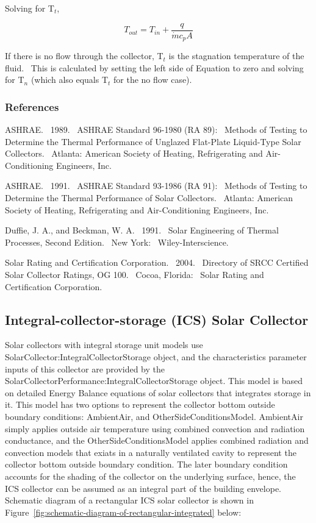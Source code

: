 Solving for T\(_{t}\),

\begin{equation}
{T_{out}} = {T_{in}} + \frac{q}{{\dot m{c_p}A}}
\end{equation}

If there is no flow through the collector, T\(_{t}\) is the stagnation temperature of the fluid.~ This is calculated by setting the left side of Equation to zero and solving for T\(_{n}\) (which also equals T\(_{t}\) for the no flow case).

\subsubsection{References}\label{references-042}

ASHRAE.~ 1989.~ ASHRAE Standard 96-1980 (RA 89):~ Methods of Testing to Determine the Thermal Performance of Unglazed Flat-Plate Liquid-Type Solar Collectors.~ Atlanta: American Society of Heating, Refrigerating and Air-Conditioning Engineers, Inc.

ASHRAE.~ 1991.~ ASHRAE Standard 93-1986 (RA 91):~ Methods of Testing to Determine the Thermal Performance of Solar Collectors.~ Atlanta: American Society of Heating, Refrigerating and Air-Conditioning Engineers, Inc.

Duffie, J. A., and Beckman, W. A.~ 1991.~ Solar Engineering of Thermal Processes, Second Edition.~ New York:~ Wiley-Interscience.

Solar Rating and Certification Corporation.~ 2004.~ Directory of SRCC Certified Solar Collector Ratings, OG 100.~ Cocoa, Florida:~ Solar Rating and Certification Corporation.

\subsection{Integral-collector-storage (ICS) Solar Collector}\label{integral-collector-storage-ics-solar-collector}

Solar collectors with integral storage unit models use SolarCollector:IntegralCollectorStorage object, and the characteristics parameter inputs of this collector are provided by the SolarCollectorPerformance:IntegralCollectorStorage object. This model is based on detailed Energy Balance equations of solar collectors that integrates storage in it. This model has two options to represent the collector bottom outside boundary conditions: AmbientAir, and OtherSideConditionsModel. AmbientAir simply applies outside air temperature using combined convection and radiation conductance, and the OtherSideConditionsModel applies combined radiation and convection models that exiats in a naturally ventilated cavity to represent the collector bottom outside boundary condition. The later boundary condition accounts for the shading of the collector on the underlying surface, hence, the ICS collector can be assumed as an integral part of the building envelope. Schematic diagram of a rectangular ICS solar collector is shown in Figure~\ref{fig:schematic-diagram-of-rectangular-integrated} below:

